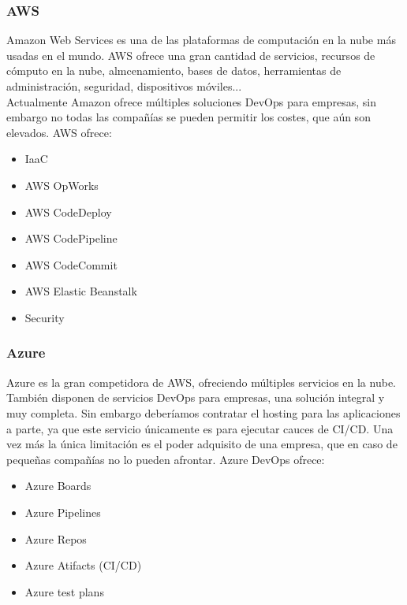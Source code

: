 		\subsubsection{AWS}
			\begin{paragraph}
				Amazon Web Services es una de las plataformas de computación en la nube más usadas en el mundo. 
				AWS ofrece una gran cantidad de servicios, recursos de cómputo en la nube, almcenamiento, bases de datos, herramientas de administración, seguridad, dispositivos móviles... \\
				Actualmente Amazon ofrece múltiples soluciones DevOps para empresas, sin embargo no todas las compañías se pueden permitir los costes, que aún son elevados. AWS ofrece:
				
				\begin{itemize}
					\item IaaC
					\item AWS OpWorks
					\item AWS CodeDeploy	
					\item AWS CodePipeline
					\item AWS CodeCommit
					\item AWS Elastic Beanstalk
					\item Security
				\end{itemize}
				
			\end{paragraph}
		
		\subsubsection{Azure}
			\begin{paragraph}
				Azure es la gran competidora de AWS, ofreciendo múltiples servicios en la nube. También disponen de servicios DevOps \cite{AzureDev63:online} para empresas, una solución integral y muy completa. Sin embargo deberíamos contratar el hosting para las aplicaciones a parte, ya que este servicio únicamente es para ejecutar cauces de CI/CD. Una vez más la única limitación es el poder adquisito de una empresa, que en caso de pequeñas compañías no lo pueden afrontar. Azure DevOps ofrece:
				\begin{itemize}
					\item Azure Boards
					\item Azure Pipelines
					\item Azure Repos
					\item Azure Atifacts (CI/CD)
					\item Azure test plans
				\end{itemize}
			\end{paragraph}
		
